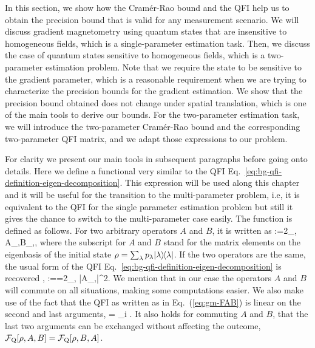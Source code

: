 In this section, we show how the Cram\'er-Rao bound and the QFI help us to obtain the precision bound that is valid for any measurement scenario.
We will discuss gradient magnetometry using quantum states that are insensitive to homogeneous fields, which is a single-parameter estimation task.
Then, we discuss the case of quantum states sensitive to homogeneous fields, which is a two-parameter estimation problem.
Note that we require the state to be sensitive to the gradient parameter, which is a reasonable requirement when we are trying to characterize the precision bounds for the gradient estimation.
We show that the precision bound obtained does not change under spatial translation, which is one of the main tools to derive our bounds.
For the two-parameter estimation task, we will introduce the two-parameter Cram\'er-Rao bound and the corresponding two-parameter QFI matrix, and we adapt those expressions to our problem.

For clarity we present our main tools in subsequent paragraphs before going onto details.
Here we define a functional very similar to the QFI Eq.~\ref{eq:bg-qfi-definition-eigen-decomposition}.
This expression will be used along this chapter and it will be useful for the transition to the multi-parameter problem, i.e, it is equivalent to the QFI for the single parameter estimation problem but still it gives the chance to switch to the multi-parameter case easily.
The function is defined as follows.
For two arbitrary operators $A$ and $B$, it is written as
\be
  \label{eq:gm-FAB}
  :=2\sum_{\lambda,\nu}
  {A}_{\lambda,\nu}{B}_{\nu,\lambda},
\ee
where the subscript for $A$ and $B$ stand for the matrix elements on the eigenbasis of the initial state $\rho = \sum_\lambda p_\lambda\vert{\lambda}\rangle{\!}\langle{\lambda}\vert$.
If the two operators are the same, the usual form of the QFI Eq.~\eqref{eq:bg-qfi-definition-eigen-decomposition} is recovered \cite{Paris2009,Braunstein1994,Holevo1982,Helstrom1976,Petz2002,Petz2008},
\be
  :==2\sum_{\lambda,\nu}
   |{A}_{\lambda,\nu}|^2.
\ee
We mention that in our case the operators $A$ and $B$ will commute on all situations, making some computations easier.
We also make use of the fact that the QFI as written as in Eq.~(\ref{eq:gm-FAB}) is linear on the second and last arguments,
\be
  \label{eq:gm-qfi-linear-in-arguments}
   = \sum_i .
\ee
It also holds for commuting $A$ and $B$, that the last two arguments can be exchanged without affecting the outcome, $\mathcal{F}_{\textnormal{Q}}[{\textstyle \rho, A, B}] = \mathcal{F}_{\textnormal{Q}}[{\textstyle \rho, B,A}]$.

